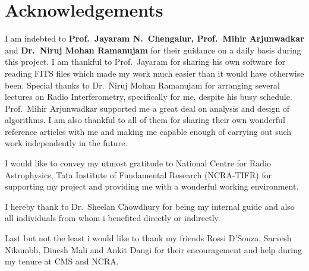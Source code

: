 \chapter*{Acknowledgements}

I am indebted to \textbf{Prof.\ Jayaram N.\ Chengalur, Prof.\ Mihir Arjunwadkar} and \textbf{Dr.\ Niruj Mohan Ramanujam} for their guidance on a daily basis during this project. I am thankful to 
Prof.\ Jayaram for sharing his own software for reading FITS files which made my work much 
easier than it would have otherwise been. Special thanks to Dr.\ Niruj Mohan Ramanujam 
for arranging several lectures on Radio Interferometry, specifically for me, despite his 
busy schedule. Prof.\ Mihir Arjunwadkar supported me a great deal on analysis and design 
of algorithms. I am also thankful to all of them for sharing their own wonderful reference 
articles with me and making me capable enough of carrying out such work independently in the 
future.

I would like to convey my utmost gratitude to National Centre for Radio Astrophysics, 
Tata Institute of Fundamental Research (NCRA-TIFR) for supporting my project and 
providing me with a wonderful working environment. 

I hereby thank to Dr.\ Sheelan Chowdhury for being my internal guide
and also all individuals from whom i benefited directly or indirectly.

Last but not the least i would like to thank my friends Rossi D'Souza, Sarvesh Nikumbh,  
Dinesh Mali and Ankit Dangi for their encouragement and help during my tenure at CMS and NCRA. 

